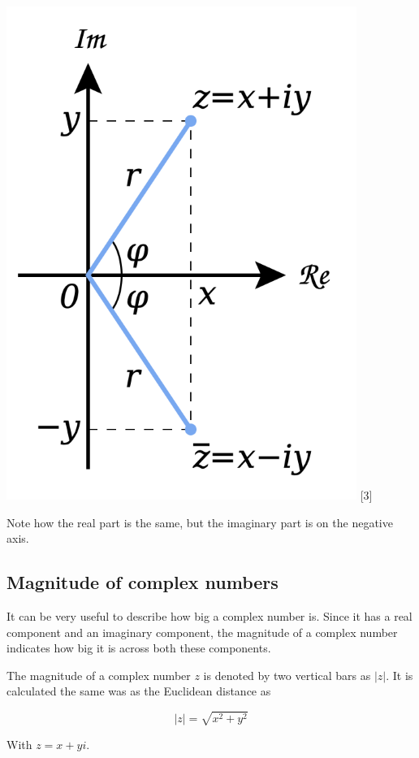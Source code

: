\documentclass{book}
\begin{document}
\begin{center}
    \includegraphics[scale=0.5]{images/Complex_conjugate_picture.svg.png}
     [3]
\end{center}

 Note how the real part is the same, but the imaginary part is on the negative axis. 

 \subsection{ Magnitude of complex numbers }

 It can be very useful to describe how big a complex number is. Since it has a real component and an imaginary component, the magnitude of a complex number indicates how big it is across both these components. 

 The magnitude of a complex number $z$ is denoted by two vertical bars as $|z|$. It is calculated the same was as the Euclidean distance as 

 $$|z| = \sqrt{x^2 + y^2}$$

 With $z = x + yi$. 
\end{document}
